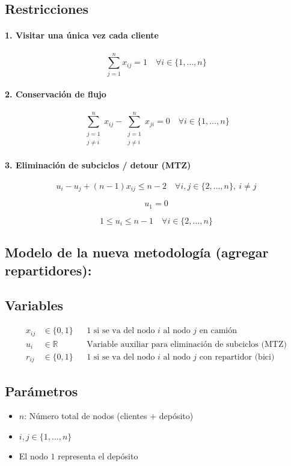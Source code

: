\documentclass{article}
\begin{document}
\subsection*{Restricciones}

\paragraph{1. Visitar una única vez cada cliente}
\[
\sum_{j=1}^{n} x_{ij} = 1 \quad \forall i \in \{1, \dots, n\}
\]

\paragraph{2. Conservación de flujo}
\[
\sum_{\substack{j=1 \\ j \ne i}}^{n} x_{ij} - \sum_{\substack{j=1 \\ j \ne i}}^{n} x_{ji} = 0 \quad \forall i \in \{1, \dots, n\}
\]

\paragraph{3. Eliminación de subciclos / detour (MTZ)}
\[
u_i - u_j + (n - 1)x_{ij} \leq n - 2 \quad \forall i, j \in \{2, \dots, n\},\ i \ne j
\]

\[
u_1 = 0
\]

\[
1 \leq u_i \leq n - 1 \quad \forall i \in \{2, \dots, n\}
\]

\subsection{Modelo de la nueva metodología (agregar repartidores):} \label{model_repartidores}
\subsection*{Variables}
\begin{align*}
    x_{ij} &\in \{0,1\} && \text{1 si se va del nodo } i \text{ al nodo } j \text{ en camión }\\
    u_i &\in \mathbb{R} && \text{Variable auxiliar para eliminación de subciclos (MTZ)} \\
    r_{ij} &\in \{0,1\} && \text{1 si se va del nodo } i \text{ al nodo } j \text{ con repartidor (bici) }
\end{align*}

\subsection*{Parámetros}
\begin{itemize}
    \item \( n \): Número total de nodos (clientes + depósito)
    \item \( i, j \in \{1, \dots, n\} \)
    \item El nodo \(1\) representa el depósito
\end{itemize}
\end{document}
